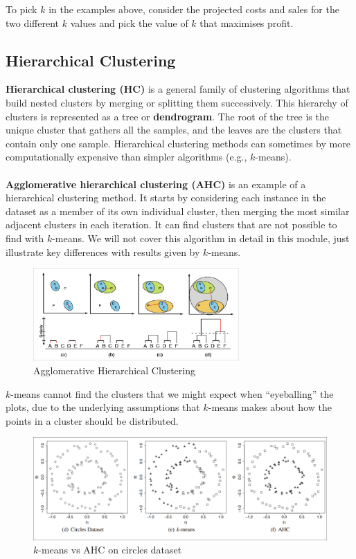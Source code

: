 \documentclass[a4paper,11pt]{article}
\begin{document}
To pick $k$ in the examples above, consider the projected costs and sales for the two different $k$ values and pick the value of $k$ that maximises profit.

\subsection{Hierarchical Clustering}
\textbf{Hierarchical clustering (HC)} is a general family of clustering algorithms that build nested clusters by merging or splitting them successively.
This hierarchy of clusters is represented as a tree or \textbf{dendrogram}.
The root of the tree is the unique cluster that gathers all the samples, and the leaves are the clusters that contain only one sample.
Hierarchical clustering methods can sometimes by more computationally expensive than simpler algorithms (e.g., $k$-means).
\\\\
\textbf{Agglomerative hierarchical clustering (AHC)} is an example of a hierarchical clustering method.
It starts by considering each instance in the dataset as a member of its own individual cluster, then merging the most similar adjacent clusters in each iteration. 
It can find clusters that are not possible to find with $k$-means.
We will not cover this algorithm in detail in this module, just illustrate key differences with results given by $k$-means.

\begin{figure}[H]
    \centering
    \includegraphics[width=0.7\textwidth]{images/aglglo.png}
    \caption{ Agglomerative Hierarchical Clustering }
\end{figure}

$k$-means cannot find the clusters that we might expect when ``eyeballing'' the plots, due to the underlying assumptions that $k$-means makes about how the points in a cluster should be distributed.

\begin{figure}[H]
    \centering
    \includegraphics[width=\textwidth]{images/kmeansvsshc.png}
    \caption{ $k$-means vs AHC on circles dataset }
\end{figure}
\end{document}
